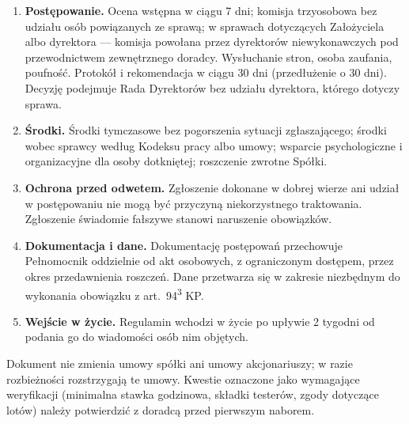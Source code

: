\documentclass[11pt,a4paper]{report}
\begin{document}
\begin{enumerate}
  \item[§~7.] \textbf{Postępowanie.} Ocena wstępna w ciągu 7 dni; komisja trzyosobowa bez udziału osób powiązanych ze sprawą; w sprawach dotyczących Założyciela albo dyrektora --- komisja powołana przez dyrektorów niewykonawczych pod przewodnictwem zewnętrznego doradcy. Wysłuchanie stron, osoba zaufania, poufność. Protokół i rekomendacja w ciągu 30 dni (przedłużenie o 30 dni). Decyzję podejmuje Rada Dyrektorów bez udziału dyrektora, którego dotyczy sprawa.
  \item[§~8.] \textbf{Środki.} Środki tymczasowe bez pogorszenia sytuacji zgłaszającego; środki wobec sprawcy według Kodeksu pracy albo umowy; wsparcie psychologiczne i organizacyjne dla osoby dotkniętej; roszczenie zwrotne Spółki.
  \item[§~9.] \textbf{Ochrona przed odwetem.} Zgłoszenie dokonane w dobrej wierze ani udział w postępowaniu nie mogą być przyczyną niekorzystnego traktowania. Zgłoszenie świadomie fałszywe stanowi naruszenie obowiązków.
  \item[§~10.] \textbf{Dokumentacja i dane.} Dokumentację postępowań przechowuje Pełnomocnik oddzielnie od akt osobowych, z ograniczonym dostępem, przez okres przedawnienia roszczeń. Dane przetwarza się w zakresie niezbędnym do wykonania obowiązku z art.~94\textsuperscript{3} KP.
  \item[§~11.] \textbf{Wejście w życie.} Regulamin wchodzi w życie po upływie 2 tygodni od podania go do wiadomości osób nim objętych.
\end{enumerate}

\vspace{1em}
{\small Dokument nie zmienia umowy spółki ani umowy akcjonariuszy; w razie rozbieżności rozstrzygają te umowy. Kwestie oznaczone jako wymagające weryfikacji (minimalna stawka godzinowa, składki testerów, zgody dotyczące lotów) należy potwierdzić z doradcą przed pierwszym naborem.\par}
\end{document}
